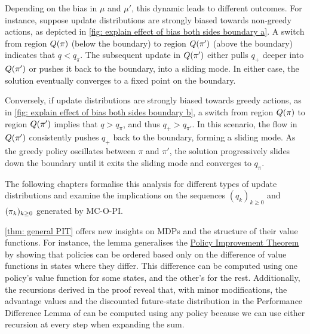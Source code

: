 Depending on the bias in $\mu$ and $\mu'$, this dynamic leads to different outcomes.
For instance, suppose update distributions are strongly biased towards non-greedy actions, as depicted in \autoref{fig: explain effect of bias both sides boundary a}.
A switch from region $Q(\pi)$ (below the boundary) to region $Q(\pi')$ (above the boundary) indicates that $q < q_\pi$.
The subsequent update in $Q(\pi')$ either pulls $q_+$ deeper into $Q(\pi')$ or pushes it back to the boundary, into a sliding mode.
In either case, the solution eventually converges to a fixed point on the boundary.

Conversely, if update distributions are strongly biased towards greedy actions, as in \autoref{fig: explain effect of bias both sides boundary b}, a switch from region $Q(\pi)$ to region $Q(\pi')$ implies that $q > q_\pi$, and thus $q_+ > q_{\pi'}$.
In this scenario, the flow in $Q(\pi')$ consistently pushes $q_+$ back to the boundary, forming a sliding mode.
As the greedy policy oscillates between $\pi$ and $\pi'$, the solution progressively slides down the boundary until it exits the sliding mode and converges to $q_\pi$.

The following chapters formalise this analysis for different types of update distributions and examine the implications on the sequences $(q_k)_{k \ge 0}$ and $(\pi_k)_{k \ge 0}$ generated by MC-O-PI.

\vspace{0.8cm}



\begin{remark}
    \autoref{thm: general PIT} offers new insights on MDPs and the structure of their value functions.
For instance, the lemma generalises the \hyperref[thm: policy improvement theorem]{Policy Improvement Theorem} by showing that policies can be ordered based only on the difference of value functions in states where they differ.
This difference can be computed using one policy's value function for some states, and the other's for the rest.
Additionally, the recursions derived in the proof 
reveal that, with minor modifications, the advantage values and the discounted future-state distribution in the Performance Difference Lemma of \citet{Kakade2002ApproximatelyLearning} can be computed using any policy because we can use either recursion at every step when expanding the sum.
\end{remark}


